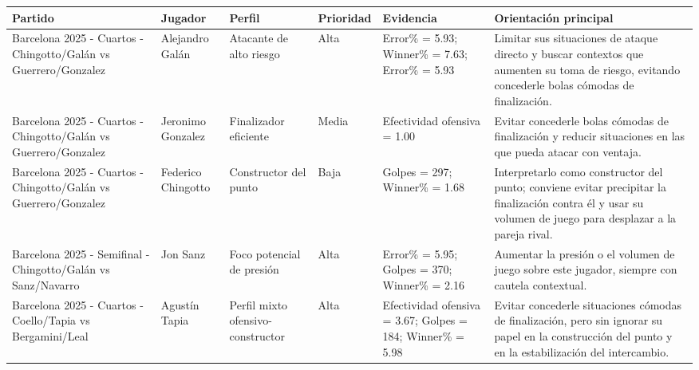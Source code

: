 \begin{tabularx}{\textwidth}{p{}p{}p{}p{}p{}X}
\toprule
Partido & Jugador & Perfil & Prioridad & Evidencia & Orientación principal \\
\midrule
Barcelona 2025 - Cuartos - Chingotto/Galán vs Guerrero/Gonzalez & Alejandro Galán & Atacante de alto riesgo & Alta & Error\% = 5.93; Winner\% = 7.63; Error\% = 5.93 & Limitar sus situaciones de ataque directo y buscar contextos que aumenten su toma de riesgo, evitando concederle bolas cómodas de finalización. \\
Barcelona 2025 - Cuartos - Chingotto/Galán vs Guerrero/Gonzalez & Jeronimo Gonzalez & Finalizador eficiente & Media & Efectividad ofensiva = 1.00 & Evitar concederle bolas cómodas de finalización y reducir situaciones en las que pueda atacar con ventaja. \\
Barcelona 2025 - Cuartos - Chingotto/Galán vs Guerrero/Gonzalez & Federico Chingotto & Constructor del punto & Baja & Golpes = 297; Winner\% = 1.68 & Interpretarlo como constructor del punto; conviene evitar precipitar la finalización contra él y usar su volumen de juego para desplazar a la pareja rival. \\
Barcelona 2025 - Semifinal - Chingotto/Galán vs Sanz/Navarro & Jon Sanz & Foco potencial de presión & Alta & Error\% = 5.95; Golpes = 370; Winner\% = 2.16 & Aumentar la presión o el volumen de juego sobre este jugador, siempre con cautela contextual. \\
Barcelona 2025 - Cuartos - Coello/Tapia vs Bergamini/Leal & Agustín Tapia & Perfil mixto ofensivo-constructor & Alta & Efectividad ofensiva = 3.67; Golpes = 184; Winner\% = 5.98 & Evitar concederle situaciones cómodas de finalización, pero sin ignorar su papel en la construcción del punto y en la estabilización del intercambio. \\
\bottomrule
\end{tabularx}

